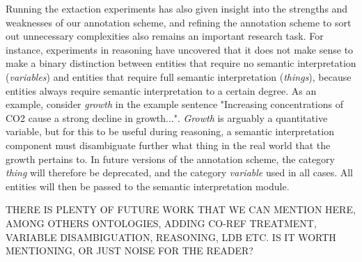 Running the extaction experiments has also given insight into the strengths and weaknesses of our annotation scheme, and refining the annotation scheme to sort out unnecessary complexities also remains an important research task. For instance, experiments in reasoning have uncovered that it does not make sense to make a binary distinction between entities that require no semantic interpretation (\emph{variables}) and entities that require full semantic interpretation (\emph{things}), because entities always require semantic interpretation to a certain degree. As an example, consider \emph{growth} in the example sentence "Increasing concentrations of CO2 cause  a strong decline in growth...". \emph{Growth} is arguably a quantitative variable, but for this to be useful during reasoning, a semantic interpretation component must disambiguate further what thing in the real world that the growth pertains to. In future versions of the annotation scheme, the category \emph{thing} will therefore be deprecated, and the category \emph{variable} used in all cases. All entities will then be passed to the semantic interpretation module.

THERE IS PLENTY OF FUTURE WORK THAT WE CAN MENTION HERE, AMONG OTHERS ONTOLOGIES, ADDING CO-REF TREATMENT, VARIABLE DISAMBIGUATION, REASONING, LDB ETC. IS IT WORTH MENTIONING, OR JUST NOISE FOR THE READER? 
